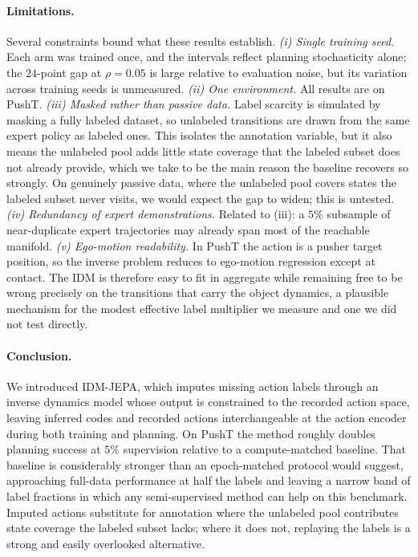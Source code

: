 \documentclass{article}
\begin{document}
\paragraph{Limitations.}
Several constraints bound what these results establish. \emph{(i) Single training
seed.} Each arm was trained once, and the intervals reflect planning stochasticity
alone; the $24$-point gap at $\rho = 0.05$ is large relative to evaluation noise, but
its variation across training seeds is unmeasured. \emph{(ii) One environment.} All
results are on PushT. \emph{(iii) Masked rather than passive data.} Label scarcity is
simulated by masking a fully labeled dataset, so unlabeled transitions are drawn from
the same expert policy as labeled ones. This isolates the annotation variable, but it
also means the unlabeled pool adds little state coverage that the labeled subset does
not already provide, which we take to be the main reason the baseline recovers so
strongly. On genuinely passive data, where the unlabeled pool covers states the
labeled subset never visits, we would expect the gap to widen; this is untested.
\emph{(iv) Redundancy of expert demonstrations.} Related to (iii): a $5\%$ subsample
of near-duplicate expert trajectories may already span most of the reachable
manifold. \emph{(v) Ego-motion readability.} In PushT the action is a pusher target
position, so the inverse problem reduces to ego-motion regression except at contact.
The IDM is therefore easy to fit in aggregate while remaining free to be wrong
precisely on the transitions that carry the object dynamics, a plausible mechanism
for the modest effective label multiplier we measure and one we did not test
directly.
\paragraph{Conclusion.}
We introduced IDM-JEPA, which imputes missing action labels through an inverse
dynamics model whose output is constrained to the recorded action space, leaving
inferred codes and recorded actions interchangeable at the action encoder during both
training and planning. On PushT the method roughly doubles planning success at $5\%$
supervision relative to a compute-matched baseline. That baseline is considerably
stronger than an epoch-matched protocol would suggest, approaching full-data
performance at half the labels and leaving a narrow band of label fractions in which
any semi-supervised method can help on this benchmark. Imputed actions substitute for
annotation where the unlabeled pool contributes state coverage the labeled subset
lacks; where it does not, replaying the labels is a strong and easily overlooked
alternative.
\end{document}
